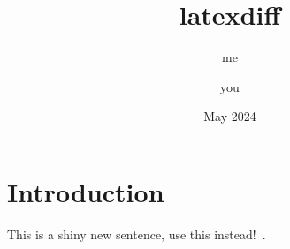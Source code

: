 \documentclass{article}
\title{latexdiff}
\author{me\and you}
\date{May 2024}
\begin{document}
\maketitle

\section{Introduction}
This is a shiny new sentence, use this instead!~\cite{wu2020phrasecut}.



\end{document}
